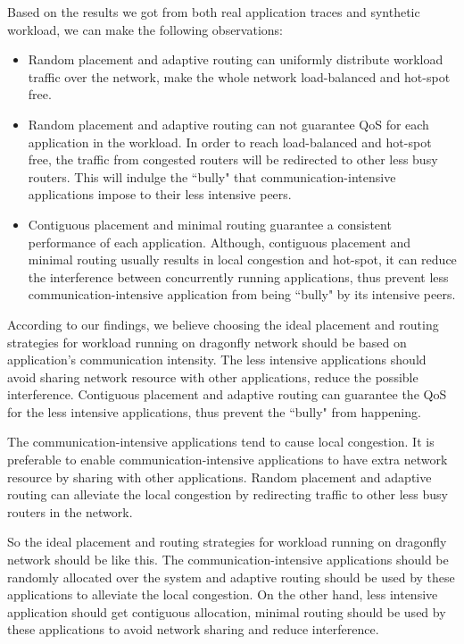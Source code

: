 \documentclass[conference,compsoc]{IEEEtran}
\begin{document}
Based on the results we got from both real application traces and synthetic workload, we can make the following observations:

\begin{itemize}
    \item Random placement and adaptive routing can uniformly distribute workload traffic over the network, make the whole network load-balanced and hot-spot free. 
    \item Random placement and adaptive routing can not guarantee QoS for each application in the workload. In order to reach load-balanced and hot-spot free, the traffic from congested routers will be redirected to other less busy routers. This will indulge the ``bully" that communication-intensive applications impose to their less intensive peers. 
    \item Contiguous placement and minimal routing guarantee a consistent performance of each application. Although, contiguous placement and minimal routing usually results in local congestion and hot-spot, it can reduce the interference between concurrently running applications, thus prevent less communication-intensive application from being ``bully" by its intensive peers.
\end{itemize}


According to our findings, we believe choosing the ideal placement and routing strategies for workload running on dragonfly network should be based on application's communication intensity. The less intensive applications should avoid sharing network resource with other applications, reduce the possible interference. Contiguous placement and adaptive routing can guarantee the QoS for the less intensive applications, thus prevent the ``bully" from happening. 

The communication-intensive applications tend to cause local congestion. It is preferable to enable communication-intensive applications to have extra network resource by sharing with other applications.  Random placement and adaptive routing can alleviate the local congestion by redirecting traffic to other less busy routers in the network. 

So the ideal placement and routing strategies for workload running on dragonfly network should be like this. The communication-intensive applications should be randomly allocated over the system and adaptive routing should be used by these applications to alleviate the local congestion. On the other hand, less intensive application should get contiguous allocation, minimal routing should be used by these applications to avoid network sharing and reduce interference. 
 
\end{document}
